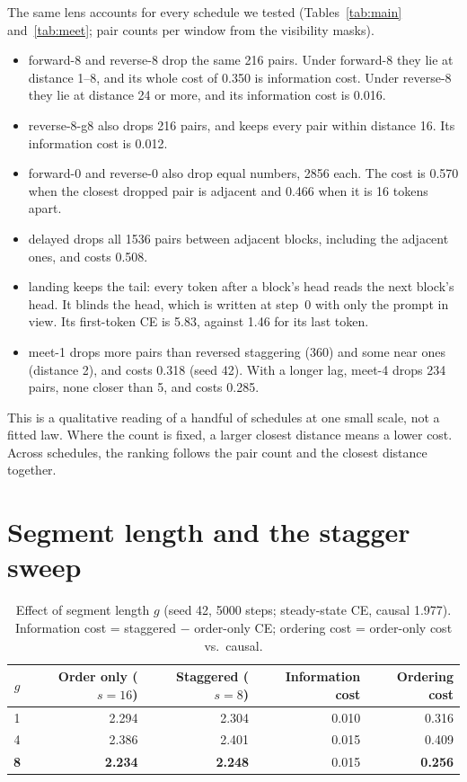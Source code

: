 \documentclass[11pt]{article}
\theoremstyle{definition}
\theoremstyle{remark}
\newcommand{\sch}[1]{\textsf{#1}}
\begin{document}
The same lens accounts for every schedule we tested (Tables~\ref{tab:main} and~\ref{tab:meet}; pair counts per window from the visibility masks).
\begin{itemize}
  \item \sch{forward-8} and \sch{reverse-8} drop the same 216 pairs. Under \sch{forward-8} they lie at distance 1--8, and its whole cost of 0.350 is information cost. Under \sch{reverse-8} they lie at distance 24 or more, and its information cost is 0.016.
  \item \sch{reverse-8-g8} also drops 216 pairs, and keeps every pair within distance 16. Its information cost is 0.012.
  \item \sch{forward-0} and \sch{reverse-0} also drop equal numbers, 2856 each. The cost is 0.570 when the closest dropped pair is adjacent and 0.466 when it is 16 tokens apart.
  \item \sch{delayed} drops all 1536 pairs between adjacent blocks, including the adjacent ones, and costs 0.508.
  \item \sch{landing} keeps the tail: every token after a block's head reads the next block's head. It blinds the head, which is written at step~0 with only the prompt in view. Its first-token CE is 5.83, against 1.46 for its last token.
  \item \sch{meet-1} drops more pairs than reversed staggering (360) and some near ones (distance 2), and costs 0.318 (seed 42). With a longer lag, \sch{meet-4} drops 234 pairs, none closer than 5, and costs 0.285.
\end{itemize}
This is a qualitative reading of a handful of schedules at one small scale, not a fitted law.
Where the count is fixed, a larger closest distance means a lower cost.
Across schedules, the ranking follows the pair count and the closest distance together.

\section{Segment length and the stagger sweep}
\label{app:sweep}

\begin{table}[t]
  \centering
  \caption{Effect of segment length $g$ (seed 42, 5000 steps; steady-state CE, causal 1.977). Information cost = staggered $-$ order-only CE; ordering cost = order-only cost vs.\ causal.}
  \label{tab:segment}
  \small
  \begin{tabular}{crrrr}
    \toprule
    $g$ & Order only ($s=16$) & Staggered ($s=8$) & Information cost & Ordering cost \\
    \midrule
    1 & 2.294 & 2.304 & 0.010 & 0.316 \\
    4 & 2.386 & 2.401 & 0.015 & 0.409 \\
    \textbf{8} & \textbf{2.234} & \textbf{2.248} & 0.015 & \textbf{0.256} \\
    \bottomrule
  \end{tabular}
\end{table}
\end{document}
